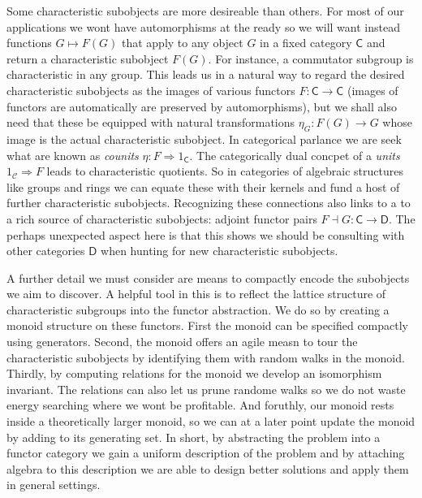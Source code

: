 \documentclass{amsart}
\begin{document}
Some characteristic subobjects are more desireable than others.  For most of our
applications we wont have automorphisms at the ready so we will want instead
functions $G\mapsto F(G)$ that apply to any object $G$ in a fixed category
$\mathsf{C}$ and return a characteristic subobject $F(G)$.  For instance, a
commutator subgroup is characteristic in any group. This leads us in a natural
way to regard the desired characteristic subobjects as the images of various
functors $F:\mathsf{C}\to \mathsf{C}$ (images of functors are automatically are
preserved by automorphisms), but we shall also need that these be equipped with
natural transformations $\eta_G:F(G)\to G$ whose image is the actual
characteristic subobject.   In categorical parlance we are seek what are known
as \emph{counits} $\eta:F\Rightarrow 1_{\mathsf{C}}$.  The categorically dual
concpet of a \emph{units} $1_{\mathcal{C}}\Rightarrow F$ leads to characteristic
quotients. So in categories of algebraic structures like groups and rings we can
equate these with their kernels and fund a host of further characteristic
subobjects. Recognizing these connections also links to a to a rich source of
characteristic subobjects: adjoint functor pairs $F\dashv G:\mathsf{C}\to \mathsf{D}$.
The perhaps unexpected aspect here is that this shows we should be consulting 
with other categories $\mathsf{D}$ when hunting for new characteristic subobjects.

A further detail we must consider are means to compactly encode the subobjects
we aim to discover.  A helpful tool in this is to reflect the lattice structure
of characteristic subgroups into the functor abstraction.  We do so by creating
a monoid structure on these functors.  First the monoid can be specified
compactly using generators.  Second, the monoid offers an agile measn to tour
the characteristic subobjects by identifying them with random walks in the
monoid.  Thirdly, by computing relations for the monoid we develop an
isomorphism invariant.  The relations can also let us prune randome walks so we
do not waste energy searching where we wont be profitable.  And foruthly, our
monoid rests inside a theoretically larger monoid, so we can at a later point
update the monoid by adding to its generating set.  In short, by abstracting 
the problem into a functor category we gain a uniform description of the problem 
and by attaching algebra to this description we are able to design better solutions
and apply them in general settings.
\end{document}
